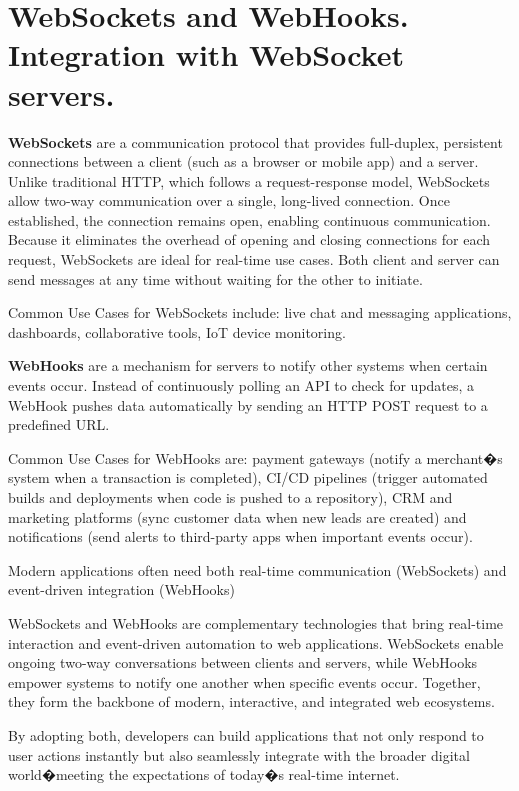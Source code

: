 
\pagebreak

\chapter{WebSockets and WebHooks. Integration with WebSocket servers.}


\medskip


\textbf{WebSockets} are a communication protocol that provides full-duplex, persistent connections between a client (such as a browser or mobile app) and a server. Unlike traditional HTTP, which follows a request-response model, WebSockets allow two-way communication over a single, long-lived connection. Once established, the connection remains open, enabling continuous communication. Because it eliminates the overhead of opening and closing connections for each request, WebSockets are ideal for real-time use cases. Both client and server can send messages at any time without waiting for the other to initiate.

Common Use Cases for WebSockets include: live chat and messaging applications, dashboards, collaborative tools, IoT device monitoring.


\textbf{WebHooks} are a mechanism for servers to notify other systems when certain events occur. Instead of continuously polling an API to check for updates, a WebHook pushes data automatically by sending an HTTP POST request to a predefined URL.

Common Use Cases for WebHooks are: payment gateways (notify a merchant�s system when a transaction is completed), CI/CD pipelines (trigger automated builds and deployments when code is pushed to a repository), CRM and marketing platforms (sync customer data when new leads are created) and notifications (send alerts to third-party apps when important events occur).


Modern applications often need both real-time communication (WebSockets) and event-driven integration (WebHooks)

WebSockets and WebHooks are complementary technologies that bring real-time interaction and event-driven automation to web applications. WebSockets enable ongoing two-way conversations between clients and servers, while WebHooks empower systems to notify one another when specific events occur. Together, they form the backbone of modern, interactive, and integrated web ecosystems.

By adopting both, developers can build applications that not only respond to user actions instantly but also seamlessly integrate with the broader digital world�meeting the expectations of today�s real-time internet.

